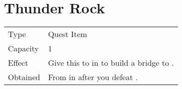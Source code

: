 \section{Thunder Rock}
\label{item:thunder_rock}


\noindent\begin{tabularx}{\textwidth}[l]{lX}
	Type
	& Quest Item
\\
	Capacity
	& 1
\\
	Effect
	& Give this to \nameref{char:otto} in \nameref{map:windia} to build a bridge to \nameref{map:spencers_place}.
\\
	Obtained
	& From \nameref{char:arion} in \nameref{map:fireburg} after you defeat \nameref{monster:pazuzu}.
\end{tabularx}

